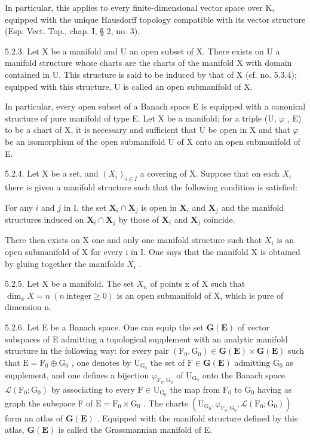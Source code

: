 In particular, this applies to every finite-dimensional vector space over K, equipped with the unique Hausdorff topology compatible with its vector structure (Esp. Vect. Top., chap. I, § 2, no. 3).

5.2.3. Let X be a manifold and U an open subset of X. There exists on U a manifold structure whose charts are the charts of the manifold X with domain contained in U. This structure is said to be induced by that of X (cf. no. 5.3.4); equipped with this structure, U is called an open submanifold of X.

In particular, every open subset of a Banach space E is equipped with a canonical structure of pure manifold of type E. Let X be a manifold; for a triple (U, \(\varphi\) , E) to be a chart of X, it is necessary and sufficient that U be open in X and that \(\varphi\) be an isomorphism of the open submanifold U of X onto an open submanifold of E.

5.2.4. Let X be a set, and \((X_{i})_{i\in I}\) a covering of X. Suppose that on each \(X_{i}\) there is given a manifold structure such that the following condition is satisfied:

For any \(i\) and \(j\) in I, the set \(\mathbf{X}_{i} \cap \mathbf{X}_{j}\) is open in \(\mathbf{X}_{i}\) and \(\mathbf{X}_{j}\) and the manifold structures induced on \(\mathbf{X}_{i} \cap \mathbf{X}_{j}\) by those of \(\mathbf{X}_{i}\) and \(\mathbf{X}_{j}\) coincide.

There then exists on X one and only one manifold structure such that \(X_{i}\) is an open submanifold of X for every i in I. One says that the manifold X is obtained by gluing together the manifolds \(X_{i}\) .

5.2.5. Let X be a manifold. The set \(X_{n}\) of points x of X such that \(\dim_{x}X=n\ (n\ \text{integer}\geqslant0)\) is an open submanifold of X, which is pure of dimension n.

5.2.6. Let E be a Banach space. One can equip the set \(\mathbf{G}(\mathbf{E})\) of vector subspaces of E admitting a topological supplement with an analytic manifold structure in the following way: for every pair \((\mathrm{F}_0, \mathrm{G}_0) \in \mathbf{G}(\mathbf{E}) \times \mathbf{G}(\mathbf{E})\) such that \(\mathrm{E} = \mathrm{F}_0 \oplus \mathrm{G}_0\) , one denotes by \(\mathrm{U}_{\mathrm{G}_0}\) the set of \(\mathrm{F} \in \mathbf{G}(\mathbf{E})\) admitting \(\mathrm{G}_0\) as supplement, and one defines a bijection \(\varphi_{\mathrm{F}_0, \mathrm{G}_0}\) of \(\mathrm{U}_{\mathrm{G}_0}\) onto the Banach space \(\mathcal{L}(\mathrm{F}_0; \mathrm{G}_0)\) by associating to every \(\mathrm{F} \in \mathrm{U}_{\mathrm{G}_0}\) the map from \(\mathrm{F}_0\) to \(\mathrm{G}_0\) having as graph the subspace F of \(\mathrm{E} = \mathrm{F}_0 \times \mathrm{G}_0\) . The charts \((\mathrm{U}_{\mathrm{G}_0}, \varphi_{\mathrm{F}_0, \mathrm{G}_0}, \mathcal{L}(\mathrm{F}_0; \mathrm{G}_0))\) form an atlas of \(\mathbf{G}(\mathbf{E})\) . Equipped with the manifold structure defined by this atlas, \(\mathbf{G}(\mathbf{E})\) is called the Grassmannian manifold of E.

